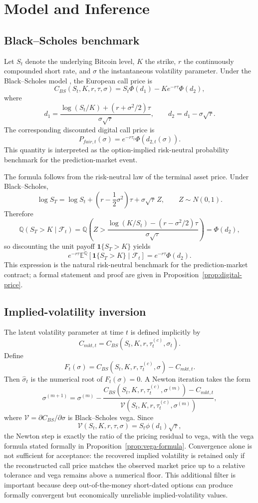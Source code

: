 \documentclass[11pt]{article}
\numberwithin{equation}{section}
\theoremstyle{plain}
\begin{document}
\section{Model and Inference}
\subsection{Black--Scholes benchmark}
Let $S_t$ denote the underlying Bitcoin level, $K$ the strike, $r$ the continuously compounded short rate, and $\sigma$ the instantaneous volatility parameter. Under the Black--Scholes model \citep{black1973}, the European call price is
\[
C_{BS}(S_t,K,r,\tau,\sigma)
=
S_t\Phi(d_1)-Ke^{-r\tau}\Phi(d_2),
\]
where
\[
d_1
=
\frac{\log(S_t/K)+(r+\sigma^2/2)\tau}{\sigma\sqrt{\tau}},
\qquad
d_2=d_1-\sigma\sqrt{\tau}.
\]
The corresponding discounted digital call price is
\[
P_{fair,t}(\sigma)
=
e^{-r\tau_t}\Phi(d_{2,t}(\sigma)).
\]
This quantity is interpreted as the option-implied risk-neutral probability benchmark for the prediction-market event.

The formula follows from the risk-neutral law of the terminal asset price. Under Black--Scholes,
\[
\log S_T
=
\log S_t+\left(r-\frac{1}{2}\sigma^2\right)\tau+\sigma\sqrt{\tau}\,Z,
\qquad
Z\sim N(0,1).
\]
Therefore
\[
\mathbb{Q}(S_T>K\mid\mathcal{F}_t)
=
\mathbb{Q}\!\left(
Z>
\frac{\log(K/S_t)-\left(r-\sigma^2/2\right)\tau}{\sigma\sqrt{\tau}}
\right)
=
\Phi(d_2),
\]
so discounting the unit payoff $\mathbf{1}\{S_T>K\}$ yields
\[
e^{-r\tau}\mathbb{E}^{\mathbb{Q}}\!\left[\mathbf{1}\{S_T>K\}\mid \mathcal{F}_t\right]
=
e^{-r\tau}\Phi(d_2).
\]
This expression is the natural risk-neutral benchmark for the prediction-market contract; a formal statement and proof are given in Proposition~\ref{prop:digital-price}.

\subsection{Implied-volatility inversion}
The latent volatility parameter at time $t$ is defined implicitly by
\[
C_{mkt,t}=C_{BS}(S_t,K,r,\tau_t^{(c)},\sigma_t).
\]
Define
\[
F_t(\sigma)=C_{BS}(S_t,K,r,\tau_t^{(c)},\sigma)-C_{mkt,t}.
\]
Then $\hat{\sigma}_t$ is the numerical root of $F_t(\sigma)=0$. A Newton iteration takes the form
\[
\sigma^{(m+1)}
=
\sigma^{(m)}
-
\frac{C_{BS}(S_t,K,r,\tau_t^{(c)},\sigma^{(m)})-C_{mkt,t}}
{\mathcal{V}(S_t,K,r,\tau_t^{(c)},\sigma^{(m)})},
\]
where $\mathcal{V}=\partial C_{BS}/\partial \sigma$ is Black--Scholes vega. Since
\[
\mathcal{V}(S_t,K,r,\tau,\sigma)=S_t\phi(d_1)\sqrt{\tau},
\]
the Newton step is exactly the ratio of the pricing residual to vega, with the vega formula stated formally in Proposition~\ref{prop:vega-formula}. Convergence alone is not sufficient for acceptance: the recovered implied volatility is retained only if the reconstructed call price matches the observed market price up to a relative tolerance and vega remains above a numerical floor. This additional filter is important because deep out-of-the-money short-dated options can produce formally convergent but economically unreliable implied-volatility values.
\end{document}
